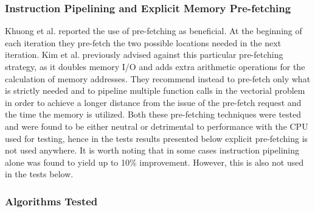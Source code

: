 \documentclass[preprint,1p,times]{elsarticle}
\begin{document}
\subsubsection{Instruction Pipelining and Explicit Memory Pre-fetching}
Khuong et al. \cite{Morin2015} reported the use of pre-fetching as beneficial. At the beginning of each iteration they pre-fetch the two possible locations needed in the next iteration. Kim et al. \cite{Kim2011} previously advised against this particular pre-fetching strategy, as it doubles memory I/O and adds extra arithmetic operations for the calculation of memory addresses. They recommend instead to pre-fetch only what is strictly needed and to pipeline multiple function calls in the vectorial problem in order to achieve a longer distance from the issue of the pre-fetch request and the time the memory is utilized.
Both these pre-fetching techniques were tested and were found to be either neutral or detrimental to performance with the CPU used for testing, hence in the tests results presented below explicit pre-fetching is not used anywhere. It is worth noting that in some cases instruction pipelining alone was found to yield up to 10\% improvement. However, this is also not used in the tests below.

\subsubsection{Algorithms Tested}
\end{document}
